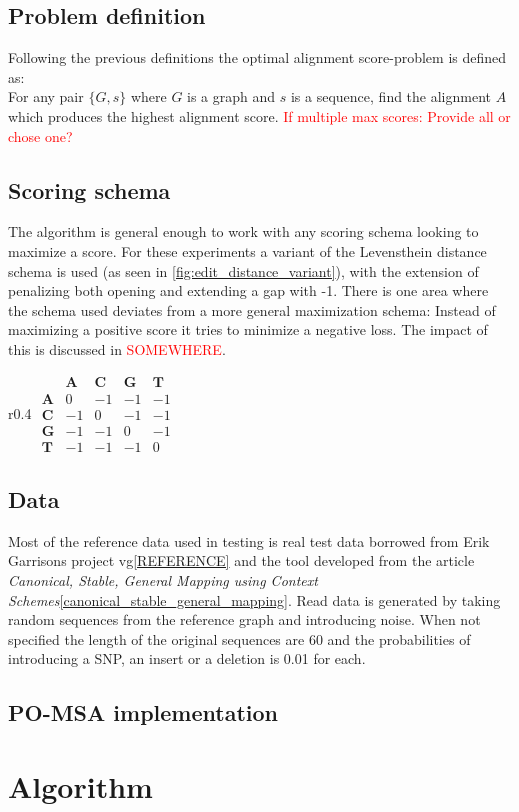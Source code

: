 \documentclass[thesis.tex]{subfiles}
\begin{document}
\subsection{Problem definition}
Following the previous definitions the optimal alignment score-problem is defined as:\\
For any pair $\{G, s\}$ where $G$ is a graph and $s$ is a sequence, find the alignment $A$ which produces the highest alignment score.
\textcolor{red}{If multiple max scores: Provide all or chose one?}
\subsection{Scoring schema}
The algorithm is general enough to work with any scoring schema looking to maximize a score. For these experiments a variant of the Levensthein distance schema is used (as seen in \ref{fig:edit_distance_variant}), with the extension of penalizing both opening and extending a gap with -1. There is one area where the schema used deviates from a more general maximization schema: Instead of maximizing a positive score it tries to minimize a negative loss. The impact of this is discussed in \textcolor{red}{SOMEWHERE}.
\begin{wrapfigure}{r}{0.4\textwidth}
	$
	\begin{array}{r|rrrr}
	 & \mathbf{A} & \mathbf{C} & \mathbf{G} & \mathbf{T} \\ \hline
	\mathbf{A} & 0 & -1 & -1 & -1 \\
	\mathbf{C} & -1 & 0 & -1 & -1 \\
	\mathbf{G} & -1 & -1 & 0 & -1 \\
	\mathbf{T} & -1 & -1 & -1 & 0
	\end{array}
	$
	\label{fig:edit_distance_variant}
	\caption{The scoring matrix used in the experiments}
\end{wrapfigure}
\subsection{Data}
Most of the reference data used in testing is real test data borrowed from Erik Garrisons project vg\ref{REFERENCE} and the tool developed from the article \textit{Canonical, Stable, General Mapping using Context Schemes}\ref{canonical_stable_general_mapping}. Read data is generated by taking random sequences from the reference graph and introducing noise. When not specified the length of the original sequences are 60 and the probabilities of introducing a SNP, an insert or a deletion is 0.01 for each.
\subsection{PO-MSA implementation}
\section{Algorithm}
\end{document}
